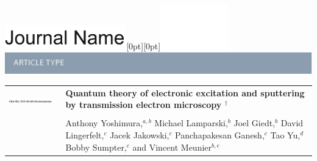 \documentclass[twoside,twocolumn,9pt]{article}
\begin{document}
  \begin{@twocolumnfalse}
{\includegraphics[height=30pt]{head_foot/journal_name}\hfill\raisebox{0pt}[0pt][0pt]{\includegraphics[height=55pt]{head_foot/RSC_LOGO_CMYK}}\\[1ex]
\includegraphics[width=18.5cm]{head_foot/header_bar}}\par
\vspace{1em}
\sffamily
\begin{tabular}{m{4.5cm} p{13.5cm} }

\includegraphics{head_foot/DOI} &
\noindent\LARGE{\textbf{%
  Quantum theory of electronic excitation and sputtering
  by transmission electron microscopy%
  $^\dag$
}} \\%
\vspace{0.3cm} & \vspace{0.3cm} \\

& \noindent\large{%
  Anthony Yoshimura,$^{a,b}$
  Michael Lamparski,$^b$
  Joel Giedt,$^b$
  David Lingerfelt,$^c$
  Jacek Jakowski,$^c$
  Panchapakesan Ganesh,$^c$
  Tao Yu,$^d$
  Bobby Sumpter,$^c$
  and
  Vincent Meunier$^{b,e}$
} \\%


\end{tabular}
\end{@twocolumnfalse}
\end{document}

